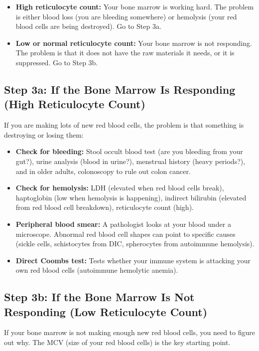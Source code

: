 \begin{itemize}
    \item \textbf{High reticulocyte count:} Your bone marrow is working hard. The problem is either blood loss (you are bleeding somewhere) or hemolysis (your red blood cells are being destroyed). Go to Step 3a.
    \item \textbf{Low or normal reticulocyte count:} Your bone marrow is not responding. The problem is that it does not have the raw materials it needs, or it is suppressed. Go to Step 3b.
\end{itemize}

\subsection{Step 3a: If the Bone Marrow Is Responding (High Reticulocyte Count)}

If you are making lots of new red blood cells, the problem is that something is destroying or losing them:

\begin{itemize}
    \item \textbf{Check for bleeding:} Stool occult blood test (are you bleeding from your gut?), urine analysis (blood in urine?), menstrual history (heavy periods?), and in older adults, colonoscopy to rule out colon cancer.
    \item \textbf{Check for hemolysis:} LDH (elevated when red blood cells break), haptoglobin (low when hemolysis is happening), indirect bilirubin (elevated from red blood cell breakdown), reticulocyte count (high).
    \item \textbf{Peripheral blood smear:} A pathologist looks at your blood under a microscope. Abnormal red blood cell shapes can point to specific causes (sickle cells, schistocytes from DIC, spherocytes from autoimmune hemolysis).
    \item \textbf{Direct Coombs test:} Tests whether your immune system is attacking your own red blood cells (autoimmune hemolytic anemia).
\end{itemize}

\subsection{Step 3b: If the Bone Marrow Is Not Responding (Low Reticulocyte Count)}

If your bone marrow is not making enough new red blood cells, you need to figure out why. The MCV (size of your red blood cells) is the key starting point.

